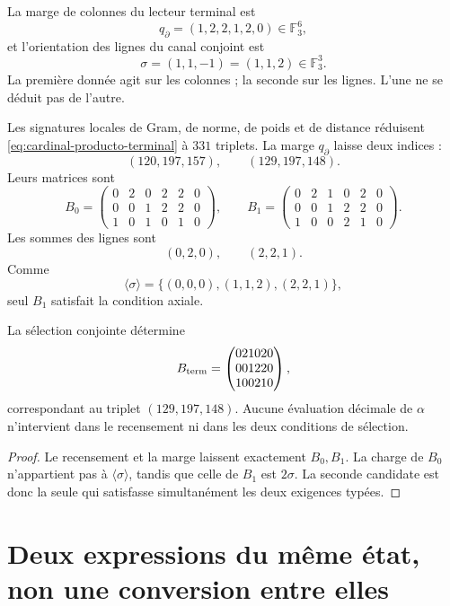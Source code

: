 La marge de colonnes du lecteur terminal est
\[
 q_\partial=(1,2,2,1,2,0)\in\mathbb F_3^6,
\]
et l’orientation des lignes du canal conjoint est
\[
 \sigma=(1,1,-1)=(1,1,2)\in\mathbb F_3^3.
\]
La première donnée agit sur les colonnes ; la seconde sur les lignes. L’une ne se déduit pas
de l’autre.

Les signatures locales de Gram, de norme, de poids et de distance réduisent
\eqref{eq:cardinal-producto-terminal} à \(331\) triplets. La marge
\(q_\partial\) laisse deux indices :
\[
 (120,197,157),
 \qquad
 (129,197,148).
\]
Leurs matrices sont
\[
 B_0=
 \begin{pmatrix}
 0&2&0&2&2&0\\
 0&0&1&2&2&0\\
 1&0&1&0&1&0
 \end{pmatrix},
 \qquad
 B_1=
 \begin{pmatrix}
 0&2&1&0&2&0\\
 0&0&1&2&2&0\\
 1&0&0&2&1&0
 \end{pmatrix}.
\]
Les sommes des lignes sont
\[
 (0,2,0),
 \qquad
 (2,2,1).
\]
Comme
\[
 \langle\sigma\rangle
 =\{(0,0,0),(1,1,2),(2,2,1)\},
\]
seul \(B_1\) satisfait la condition axiale.

\begin{theorem}
\label{thm:unicidad-publicacion-terminal-visible}
La sélection conjointe détermine
\begin{equation}
 B_{\rm term}=
 \begin{pmatrix}
 021020\\001220\\100210
 \end{pmatrix},
 \label{eq:matriz-terminal-visible}
\end{equation}
correspondant au triplet \((129,197,148)\). Aucune évaluation décimale de
\(\alpha\) n’intervient dans le recensement ni dans les deux conditions de sélection.
\end{theorem}

\begin{proof}
Le recensement et la marge laissent exactement \(B_0,B_1\). La charge de \(B_0\)
n’appartient pas à \(\langle\sigma\rangle\), tandis que celle de \(B_1\) est
\(2\sigma\). La seconde candidate est donc la seule qui satisfasse
simultanément les deux exigences typées.
\end{proof}

\section{Deux expressions du même état, non une conversion entre elles}

